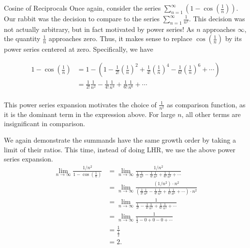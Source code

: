 \begin{example}{Cosine of Reciprocals}
Once again, consider the series $\sum_{n=1}^\infty \left(1-\cos\left(\frac{1}{n}\right)\right)$. 
Our rabbit was the decision to compare to the series $\sum_{n=1}^\infty\frac{1}{n^2}$.  This decision was not actually arbitrary, but in fact motivated by power series!  As $n$ approaches $\infty$, the quantity $\frac{1}{n}$ approaches zero.  Thus, it makes sense to replace $\cos\left(\frac{1}{n}\right)$ by its power series centered at zero.  Specifically, we have 

\begin{align*}
1-\cos\left(\frac{1}{n}\right)&=1-\left(1-\frac{1}{2!}\left(\frac{1}{n}\right)^2+\frac{1}{4!}\left(\frac{1}{n}\right)^4-\frac{1}{6!}\left(\frac{1}{n}\right)^6+\cdots\right)\\ 
&=\frac{1}{2!}\frac{1}{n^2}-\frac{1}{4!}\frac{1}{n^4}+\frac{1}{6!}\frac{1}{n^6}+\cdots\\ 
\end{align*}

This power series expansion motivates the choice of $\frac{1}{n^2}$ as comparison function, as it is the dominant term in the expression above.  For large $n$, all other terms are insignificant in comparison.   


We again demonstrate the summands have the same growth order by taking a limit of their ratios.  This time, instead of doing LHR, we use the above power series expansion.
\begin{align*}
\lim_{n\to\infty}\frac{1/n^2}{1-\cos\left(\frac{1}{n}\right)}&=\lim_{n\to\infty}\frac{1/n^2}{\frac{1}{2!}\frac{1}{n^2}-\frac{1}{4!}\frac{1}{n^4}+\frac{1}{6!}\frac{1}{n^6}+\cdots} \\
&=\lim_{n\to\infty}\frac{\left(1/n^2\right)\cdot n^2}{\left(\frac{1}{2!}\frac{1}{n^2}-\frac{1}{4!}\frac{1}{n^4}+\frac{1}{6!}\frac{1}{n^6}+\cdots\right)\cdot n^2} \\
&=\lim_{n\to\infty}\frac{1}{\frac{1}{2!}-\frac{1}{4!}\frac{1}{n^2}+\frac{1}{6!}\frac{1}{n^4}+\cdots } \\
&=\lim_{n\to\infty}\frac{1}{\frac{1}{2}-0+0-0+\cdots} \\
&=\frac{1}{\frac{1}{2}}\\
&=2.
\end{align*}
\end{example}

